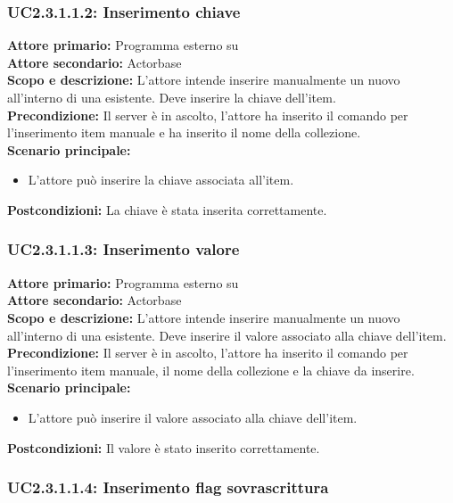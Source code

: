 \documentclass{scalatekids-article}
\begin{document}
\subsubsection{UC2.3.1.1.2: Inserimento chiave}

\textbf{Attore primario:} Programma esterno su \\
\textbf{Attore secondario:} Actorbase\\
\textbf{Scopo e descrizione:} L'attore intende inserire manualmente un nuovo  all'interno di una  esistente. Deve inserire la chiave dell'item.\\
\textbf{Precondizione:} Il server è in ascolto, l'attore ha inserito il comando per l'inserimento item manuale e ha inserito il nome della collezione.\\
\textbf{Scenario principale:}
\begin{itemize}
\item L'attore può inserire la chiave associata all'item.
\end{itemize}
\textbf{Postcondizioni:} La chiave è stata inserita correttamente.

\subsubsection{UC2.3.1.1.3: Inserimento valore}

\textbf{Attore primario:} Programma esterno su \\
\textbf{Attore secondario:} Actorbase\\
\textbf{Scopo e descrizione:} L'attore intende inserire manualmente un nuovo  all'interno di una  esistente. Deve inserire il valore associato alla chiave dell'item.\\
\textbf{Precondizione:} Il server è in ascolto, l'attore ha inserito il comando per l'inserimento item manuale, il nome della collezione e la chiave da inserire.\\
\textbf{Scenario principale:}
\begin{itemize}
\item L'attore può inserire il valore associato alla chiave dell'item.
\end{itemize}
\textbf{Postcondizioni:} Il valore è stato inserito correttamente.

\subsubsection{UC2.3.1.1.4: Inserimento flag sovrascrittura}
\end{document}

